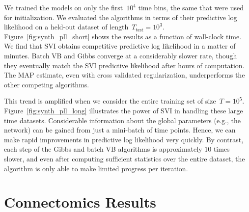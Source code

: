 We trained the models on only the first~$10^4$ time bins, the same
that were used for initialization.  We evaluated the algorithms in
terms of their predictive log likelihood on a held-out dataset of
length~$T_{\mathsf{test}}=10^3$.  Figure~\ref{fig:synth_pll_short}
shows the results as a function of wall-clock time.  We find that SVI
obtains competitive predictive log likelihood in a matter of minutes.
Batch VB and Gibbs converge at a considerably slower rate, though they
eventually match the SVI predictive likelihood after hours of
computation.  The MAP estimate, even with cross validated
regularization, underperforms the other competing algorithms.

This trend is amplified when we consider the entire training set of
size~$T=10^5$.  Figure~\ref{fig:synth_pll_long} illustrates the power
of SVI in handling these large time datasets.  Considerable
information about the global parameters (e.g., the network) can be
gained from just a mini-batch of time points.  Hence, we can make
rapid improvements in predictive log likelihood very quickly.  By
contrast, each step of the Gibbs and batch VB algorithms is
approximately $10$ times slower, and even after computing sufficient
statistics over the entire dataset, the algorithm is only able to make
limited progress per iteration.

\section{Connectomics Results}

